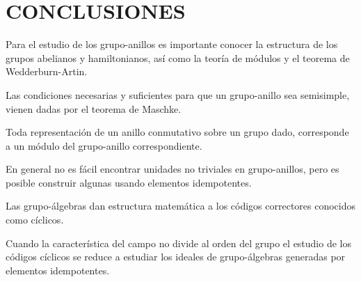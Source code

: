 \chapter{CONCLUSIONES}


\begin{finalList}
\item Para el estudio de los grupo-anillos es importante conocer la estructura de los grupos abelianos y hamiltonianos, así como la teoría de módulos y el teorema de Wedderburn-Artin.
\item Las condiciones necesarias y suficientes para que un grupo-anillo sea semisimple, vienen dadas por el teorema de Maschke.
\item Toda representación de un anillo conmutativo sobre un grupo dado, corresponde a un módulo del grupo-anillo correspondiente.
\item En general no es fácil encontrar unidades no triviales en grupo-anillos, pero es posible construir algunas usando elementos idempotentes.
\item Las grupo-álgebras dan estructura matemática a los códigos correctores conocidos como cíclicos. 
\item Cuando la característica del campo no divide al orden del grupo el estudio de los códigos cíclicos se reduce a estudiar los ideales de grupo-álgebras generadas por elementos idempotentes.
\end{finalList}
